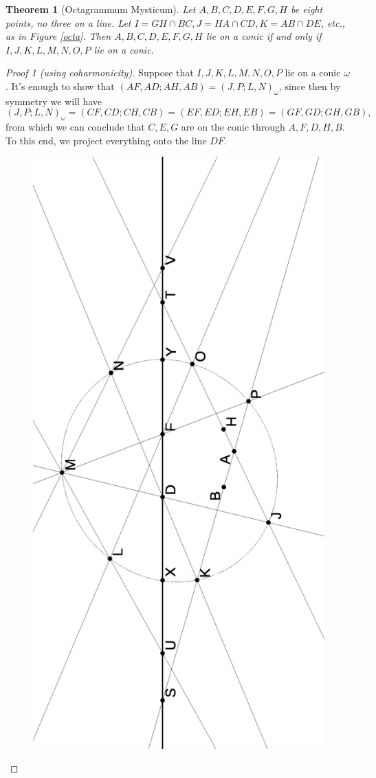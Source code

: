 \documentclass[letterpaper,11pt]{article}
\newtheorem{thm}{Theorem}
\theoremstyle{definition}
\theoremstyle{remark}
\begin{document}
\begin{thm}[Octagrammum Mysticum] Let $A,B,C,D,E,F,G,H$ be eight points, no three on a line. Let $I = GH\cap BC, J = HA\cap CD, K = AB\cap DE$, etc., as in Figure \ref{octa}. Then $A,B,C,D,E,F,G,H$ lie on a conic if and only if $I,J,K,L,M,N,O,P$ lie on a conic.
\end{thm}
\begin{proof}[Proof 1 (using coharmonicity)] Suppose that $I,J,K,L,M,N,O,P$ lie on a conic $\omega$. It's enough to show that $(AF,AD;AH,AB) = (J,P;L,N)_\omega$, since then by symmetry we will have
\[
(J,P;L,N)_\omega = (CF,CD;CH,CB) = (EF,ED;EH,EB) = (GF,GD;GH,GB),
\]
from which we can conclude that $C,E,G$ are on the conic through $A,F,D,H,B$. To this end, we project everything onto the line $DF$.
\begin{figure}[!htb]
\centering
\includegraphics[scale=0.5,angle=270]{octa1.eps}

\end{figure}
\end{proof}
\end{document}

